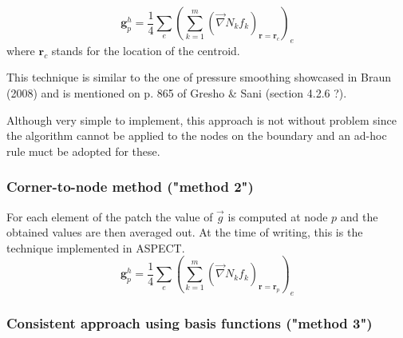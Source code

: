 \[
\bm g_p^h = \frac{1}{4} \sum_{e} \left( \sum_{k=1}^m  (\vec\nabla N_k f_k)_{\bm r=\bm r_c} \right)_e
\]
where $\bm r_c$ stands for the location of the centroid. 

This technique is similar to the one of pressure smoothing showcased 
in Braun \etal (2008) \cite{brtf08}
and is mentioned on p. 865 of Gresho \& Sani \cite{grsa} (section 4.2.6 ?).

Although very simple to implement, this approach is not without problem since 
the algorithm cannot be applied to the nodes on the boundary and an ad-hoc 
rule muct be adopted for these. 



\subsubsection{Corner-to-node method ("method 2")}

For each element of the patch the value of $\vec g$ is computed at node $p$ and the obtained
values are then averaged out. At the time of writing, this is the technique implemented in  
ASPECT.
\[
\bm g_p^h = \frac{1}{4} \sum_{e} \left( \sum_{k=1}^m  (\vec\nabla N_k f_k)_{\bm r=\bm r_p} \right)_e
\]


\subsubsection{Consistent approach using basis functions ("method 3")}

